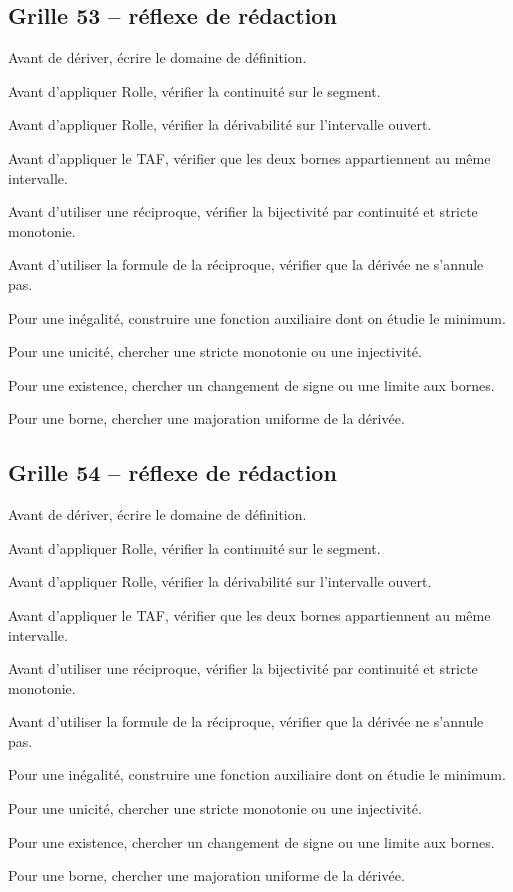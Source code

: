 \documentclass[11pt,a4paper]{article}
\begin{document}
\subsection*{Grille 53 -- réflexe de rédaction}

\begin{methodebox}

Avant de dériver, écrire le domaine de définition.

Avant d'appliquer Rolle, vérifier la continuité sur le segment.

Avant d'appliquer Rolle, vérifier la dérivabilité sur l'intervalle ouvert.

Avant d'appliquer le TAF, vérifier que les deux bornes appartiennent au même intervalle.

Avant d'utiliser une réciproque, vérifier la bijectivité par continuité et stricte monotonie.

Avant d'utiliser la formule de la réciproque, vérifier que la dérivée ne s'annule pas.

Pour une inégalité, construire une fonction auxiliaire dont on étudie le minimum.

Pour une unicité, chercher une stricte monotonie ou une injectivité.

Pour une existence, chercher un changement de signe ou une limite aux bornes.

Pour une borne, chercher une majoration uniforme de la dérivée.

\end{methodebox}

\subsection*{Grille 54 -- réflexe de rédaction}

\begin{methodebox}

Avant de dériver, écrire le domaine de définition.

Avant d'appliquer Rolle, vérifier la continuité sur le segment.

Avant d'appliquer Rolle, vérifier la dérivabilité sur l'intervalle ouvert.

Avant d'appliquer le TAF, vérifier que les deux bornes appartiennent au même intervalle.

Avant d'utiliser une réciproque, vérifier la bijectivité par continuité et stricte monotonie.

Avant d'utiliser la formule de la réciproque, vérifier que la dérivée ne s'annule pas.

Pour une inégalité, construire une fonction auxiliaire dont on étudie le minimum.

Pour une unicité, chercher une stricte monotonie ou une injectivité.

Pour une existence, chercher un changement de signe ou une limite aux bornes.

Pour une borne, chercher une majoration uniforme de la dérivée.

\end{methodebox}
\end{document}
